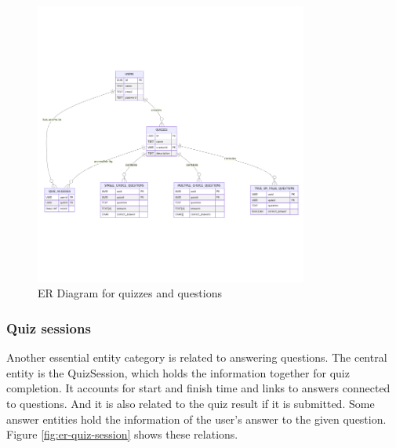 \begin{figure}[H]
    \centering
    \includegraphics[width=0.8\textwidth, keepaspectratio]{figures/er-quizzes.png}
    \caption{ER Diagram for quizzes and questions}
    \label{fig:er-quizzes}
\end{figure}

\subsubsection{Quiz sessions}

Another essential entity category is related to answering questions. The central entity is the QuizSession, which holds the information together for quiz completion. It accounts for start and finish time and links to answers connected to questions. And it is also related to the quiz result if it is submitted. Some answer entities hold the information of the user's answer to the given question. Figure \ref{fig:er-quiz-session} shows these relations.

